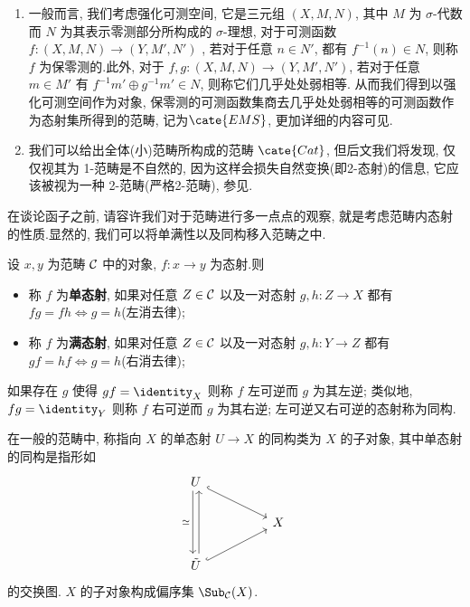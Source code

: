 \begin{example}
\begin{enumerate}
        \item 一般而言, 我们考虑强化可测空间, 它是三元组 $(X,M,N)$, 其中 $M$ 为 $\sigma$-代数而 $N$ 为其表示零测部分所构成的 $\sigma$-理想, 对于可测函数 $f : (X,M,N) \to (Y,M',N')$ , 若对于任意 $n\in N'$, 都有 $f^{-1}(n) \in N$, 则称 $f$ 为保零测的.此外, 对于 $f,g : (X,M,N) \to (Y,M',N')$, 若对于任意 $m\in M'$ 有 $f^{-1}m'\oplus g^{-1}m'\in N$, 则称它们几乎处处弱相等.
        从而我们得到以强化可测空间作为对象, 保零测的可测函数集商去几乎处处弱相等的可测函数作为态射集所得到的范畴, 记为$\cate{EMS}$, 更加详细的内容可见\cite[\href{https://ncatlab.org/nlab/show/categories+of+measure+theory}{nlab}]{nlab:homepage}.
        \item 我们可以给出全体(小)范畴所构成的范畴 $\cate{Cat}$, 但后文我们将发现, 仅仅视其为 1-范畴是不自然的, 因为这样会损失自然变换(即2-态射)的信息, 它应该被视为一种 2-范畴(严格2-范畴), 参见\cite[2-范畴词条]{BananaSpace}.
    \end{enumerate}
\end{example}
在谈论函子之前, 请容许我们对于范畴进行多一点点的观察, 就是考虑范畴内态射的性质.显然的, 我们可以将单满性以及同构移入范畴之中.
\begin{definition}
    设 $x,y$ 为范畴 $\cal{C}$ 中的对象, $f:x \to y$ 为态射.则
    \begin{itemize}
        \item 称 $f$ 为\textbf{单态射}, 如果对任意 $Z\in \cal{C}$ 以及一对态射 $g,h : Z \to X$ 都有 $fg = fh \Leftrightarrow g=h$(左消去律);
        \item 称 $f$ 为\textbf{满态射}, 如果对任意 $Z \in \cal{C}$ 以及一对态射 $g,h : Y \to Z$ 都有 $gf = hf \Leftrightarrow g=h$(右消去律);
    \end{itemize}
    如果存在 $g$ 使得 $gf = \identity_X$ 则称 $f$ 左可逆而 $g$ 为其左逆; 类似地, $fg = \identity_Y$ 则称 $f$ 右可逆而 $g$ 为其右逆; 左可逆又右可逆的态射称为同构.
\end{definition}
\begin{definition}[子对象]\label{定义-子对象}
    在一般的范畴中, 称指向 $X$ 的单态射 $U\to X$ 的同构类为 $X$ 的子对象, 其中单态射的同构是指形如
    \[\begin{tikzcd}
	U \\
	&& X \\
	{\tilde{U}}
	\arrow[hook, from=1-1, to=2-3]
	\arrow["\simeq"', shift right, from=1-1, to=3-1]
	\arrow[shift right, from=3-1, to=1-1]
	\arrow[hook, from=3-1, to=2-3]
    \end{tikzcd}\]
    的交换图. $X$ 的子对象构成偏序集 $\Sub_{\cal{C}}(X)$.
\end{definition}
